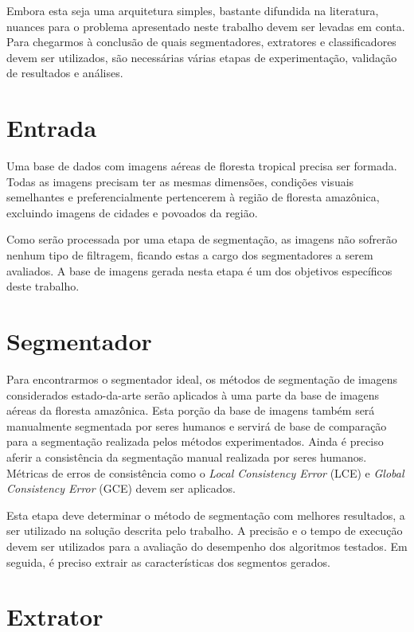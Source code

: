 Embora esta seja uma arquitetura simples, bastante difundida na literatura, nuances para o problema apresentado neste trabalho devem ser levadas em conta. Para chegarmos à conclusão de quais segmentadores, extratores e classificadores devem ser utilizados, são necessárias várias etapas de experimentação, validação de resultados e análises.

\section{Entrada}

Uma base de dados com imagens aéreas de floresta tropical precisa ser formada. Todas as imagens precisam ter as mesmas dimensões, condições visuais semelhantes e preferencialmente pertencerem à região de floresta amazônica, excluindo imagens de cidades e povoados da região.

Como serão processada por uma etapa de segmentação, as imagens não sofrerão nenhum tipo de filtragem, ficando estas a cargo dos segmentadores a serem avaliados. A base de imagens gerada nesta etapa é um dos objetivos específicos deste trabalho.

\section{Segmentador}\label{sec:metSegmentador}

Para encontrarmos o segmentador ideal, os métodos de segmentação de imagens considerados estado-da-arte serão aplicados à uma parte da base de imagens aéreas da floresta amazônica. Esta porção da base de imagens também será manualmente segmentada por seres humanos e servirá de base de comparação para a segmentação realizada pelos métodos experimentados. Ainda é preciso aferir a consistência da segmentação manual realizada por seres humanos. Métricas de erros de consistência como o \textit{Local Consistency Error} (LCE) e \textit{Global Consistency Error} (GCE) devem ser aplicados.

Esta etapa deve determinar o método de segmentação com melhores resultados, a ser utilizado na solução descrita pelo trabalho. A precisão e o tempo de execução devem ser utilizados para a avaliação do desempenho dos algoritmos testados. Em seguida, é preciso extrair as características dos segmentos gerados.

\section{Extrator}\label{sec:metExtrator}

